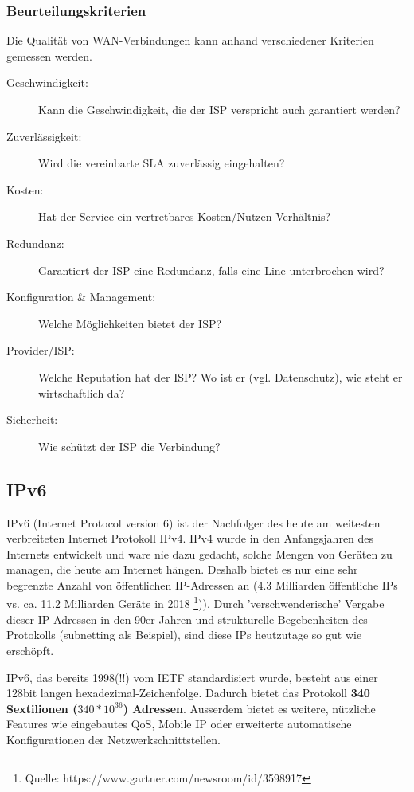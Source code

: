\documentclass[a4paper, 11pt]{article}
\begin{document}
\subsubsection{Beurteilungskriterien}
Die Qualität von WAN-Verbindungen kann anhand verschiedener Kriterien gemessen werden.

\begin{description}
	\item[Geschwindigkeit: ] Kann die Geschwindigkeit, die der ISP verspricht auch garantiert werden?
	\item [Zuverlässigkeit: ] Wird die vereinbarte SLA zuverlässig eingehalten?
	\item[Kosten: ] Hat der Service ein vertretbares Kosten/Nutzen Verhältnis?
	\item[Redundanz: ] Garantiert der ISP eine Redundanz, falls eine Line unterbrochen wird?
	\item[Konfiguration \& Management: ] Welche Möglichkeiten bietet der ISP?
	\item[Provider/ISP: ] Welche Reputation hat der ISP? Wo ist er (vgl. Datenschutz), wie steht er wirtschaftlich da?
	\item[Sicherheit: ] Wie schützt der ISP die Verbindung?
\end{description}

\subsection{IPv6}
IPv6 (Internet Protocol version 6) ist der Nachfolger des heute am weitesten verbreiteten Internet Protokoll IPv4. IPv4 wurde in den Anfangsjahren des Internets entwickelt und ware nie dazu gedacht, solche Mengen von Geräten zu managen, die heute am Internet hängen. Deshalb bietet es nur eine sehr begrenzte Anzahl von öffentlichen IP-Adressen an (4.3 Milliarden öffentliche IPs vs. ca. 11.2 Milliarden Geräte in 2018 \footnote{Quelle: https://www.gartner.com/newsroom/id/3598917})). Durch 'verschwenderische' Vergabe dieser IP-Adressen in den 90er Jahren und strukturelle Begebenheiten des Protokolls (subnetting als Beispiel), sind diese IPs heutzutage so gut wie erschöpft.

IPv6, das bereits 1998(!!) vom IETF standardisiert wurde, besteht aus einer 128bit langen hexadezimal-Zeichenfolge. Dadurch bietet das Protokoll \textbf{340 Sextilionen ($340 * 10^{36} $) Adressen}. Ausserdem bietet es weitere, nützliche Features wie eingebautes QoS, Mobile IP oder erweiterte automatische Konfigurationen der Netzwerkschnittstellen.
\end{document}
